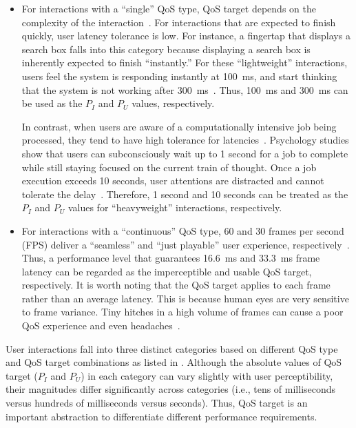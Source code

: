 \begin{itemize}
\item For interactions with a ``single'' QoS type, QoS target depends on the complexity of the interaction~\cite{eventlatency}. For interactions that are expected to finish quickly, user latency tolerance is low. For instance, a fingertap that displays a search box falls into this category because displaying a search box is inherently expected to finish ``instantly.'' For these ``lightweight'' interactions, users feel the system is responding instantly at 100~ms, and start thinking that the system is not working after 300~ms~\cite{humanperception}. Thus, 100~ms and 300~ms can be used as the $P_I$ and $P_U$ values, respectively.

In contrast, when users are aware of a computationally intensive job being processed, they tend to have high tolerance for latencies~\cite{usability_engineering}. Psychology studies show that users can subconsciously wait up to 1 second for a job to complete while still staying focused on the current train of thought. Once a job execution exceeds 10 seconds, user attentions are distracted and cannot tolerate the delay~\cite{info_vis,response_time}. Therefore, 1 second and 10 seconds can be treated as the $P_I$ and $P_U$ values for ``heavyweight'' interactions, respectively.

\item For interactions with a ``continuous'' QoS type, 60 and 30 frames per second (FPS) deliver a ``seamless'' and ``just playable'' user experience, respectively~\cite{fps_target}. Thus, a performance level that guarantees 16.6~ms and 33.3~ms frame latency can be regarded as the imperceptible and usable QoS target, respectively. It is worth noting that the QoS target applies to each frame rather than an average latency. This is because human eyes are very sensitive to frame variance. Tiny hitches in a high volume of frames can cause a poor QoS experience and even headaches~\cite{jankbusting,adaptivevsync}.
\end{itemize}

User interactions fall into three distinct categories based on different QoS type and QoS target combinations as listed in . Although the absolute values of QoS target ($P_I$ and $P_U$) in each category can vary slightly with user perceptibility, their magnitudes differ significantly across categories (i.e., tens of milliseconds versus hundreds of milliseconds versus seconds). Thus, QoS target is an important abstraction to differentiate different performance requirements.

